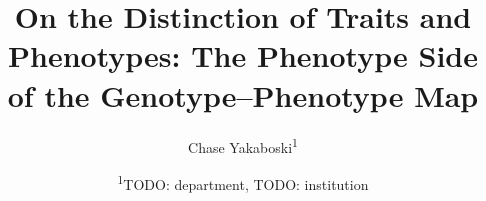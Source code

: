 \documentclass[11pt, a4paper]{article}
\begin{document}
\title{On the Distinction of Traits and Phenotypes: The Phenotype Side of the Genotype–Phenotype Map}
\author{Chase Yakaboski\textsuperscript{1}}
\date{\textsuperscript{1}TODO: department, TODO: institution}
\maketitle












\end{document}
